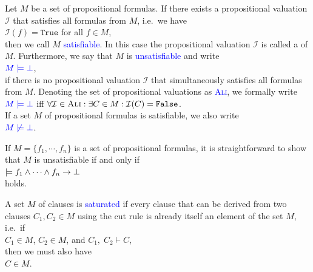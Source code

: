 \begin{Definition}[Satisfiability]  \hspace*{\fill} \linebreak
  Let $M$ be a set of propositional formulas.
  If there exists a propositional valuation $\mathcal{I}$ that satisfies all formulas from $M$, i.e.~we have
  \\[0.2cm]
  \hspace*{1.3cm}
  $\mathcal{I}(f) = \texttt{True}$ \quad for all $f \in M$,
  \\[0.2cm]
  then we call $M$ \textcolor{blue}{satisfiable}.  In this case the propositional
  valuation $\mathcal{I}$ is called a  of $M$.
  Furthermore, we say that $M$ is \textcolor{blue}{unsatisfiable}
  and write 
  \\[0.2cm]
  \hspace*{1.3cm}
  $\textcolor{blue}{M \models \bot}$, 
  \\[0.2cm]
  if there is no propositional valuation $\mathcal{I}$ that simultaneously satisfies all formulas from $M$.
  Denoting the set of propositional valuations as
  \textsc{\textcolor{blue}{Ali}}, we formally write
  \\[0.2cm]
  \hspace*{1.3cm}
  $\textcolor{blue}{M \models \bot}$ \quad iff \quad 
  $\forall \mathcal{I} \in \textsc{Ali}: \exists C \in M: \mathcal{I}(C) = \texttt{False}$.
  \\[0.2cm]
  If a set $M$ of propositional formulas is satisfiable, we also write
  \\[0.2cm]
  \hspace*{1.3cm}
  $\textcolor{blue}{M \not\models \bot}$.
  \eox
\end{Definition}

\remarkEng 
If $M = \{ f_1, \cdots, f_n \}$ is a set of propositional formulas, it is straightforward to show that
$M$ is unsatisfiable if and only if
\\[0.2cm]
\hspace*{1.3cm}
$\models f_1 \wedge \cdots \wedge f_n \rightarrow \bot$
\\[0.2cm]
holds. \eox

\begin{Definition} \hspace*{\fill} \linebreak
  A set $M$ of clauses is \textcolor{blue}{saturated}  if every clause that can be derived from two
  clauses $C_1, C_2 \in M$ using the cut rule is already itself an element of
  the set $M$, i.e.~if
  \\[0.2cm]
  \hspace*{1.3cm}
  $C_1 \in M$, \quad $C_2 \in M$, \quad and \quad $C_1,\; C_2 \vdash C$,
  \\[0.2cm]
  then we must also have 
  \\[0.2cm]
  \hspace*{1.3cm}
  $C \in M$.
\end{Definition}
 
